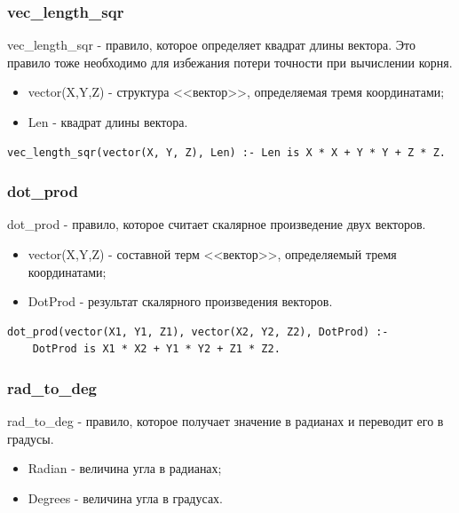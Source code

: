 \subsubsection{vec\_length\_sqr}

\hspace{0.6cm} vec\_length\_sqr - правило, которое определяет квадрат длины вектора. Это правило тоже необходимо для избежания потери точности при вычислении корня.

\begin{itemize}
	\item vector(X,Y,Z) - структура <<вектор>>, определяемая тремя координатами;
	\item Len - квадрат длины вектора.
\end{itemize}

\begin{lstlisting}[caption=Реализация правила vec\_length\_sqr, label=rules:veclengthsqr]
vec_length_sqr(vector(X, Y, Z), Len) :- Len is X * X + Y * Y + Z * Z.
\end{lstlisting}

\subsubsection{dot\_prod}
\hspace{0.6cm} dot\_prod - правило, которое считает скалярное произведение двух векторов.

\begin{itemize}
	\item vector(X,Y,Z) - составной терм <<вектор>>, определяемый  тремя координатами;
	\item DotProd - результат скалярного произведения векторов.
\end{itemize}

\begin{lstlisting}[caption=Реализация правила dot\_prod, label=rules:dotprod]
dot_prod(vector(X1, Y1, Z1), vector(X2, Y2, Z2), DotProd) :-
	DotProd is X1 * X2 + Y1 * Y2 + Z1 * Z2.
\end{lstlisting}

\subsubsection{rad\_to\_deg}
\hspace{0.6cm} rad\_to\_deg - правило, которое получает значение в радианах и переводит его в градусы.

\begin{itemize}
	\item Radian - величина угла в радианах;
	\item Degrees - величина угла в градусах.
\end{itemize}

